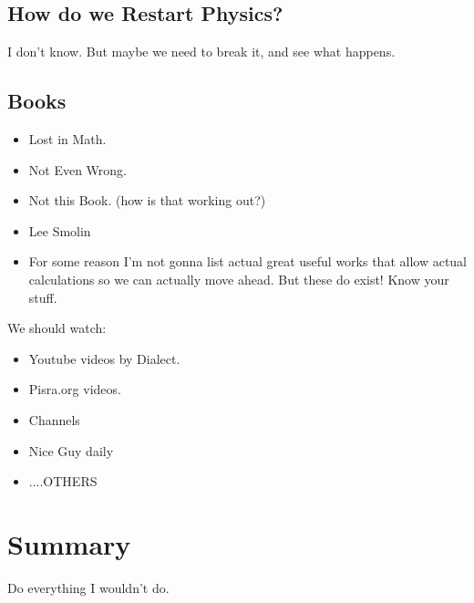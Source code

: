 \documentclass[../rzero]{subfiles}
\begin{document}
\subsection{How do we Restart Physics?}
I don't know. But maybe we need to break it, and see what happens.
\subsection{Books}
\begin{itemize}
  \item Lost in Math.
  \item Not Even Wrong.
  \item Not this Book. (how is that working out?)
  \item Lee Smolin
  \item For some reason I'm not gonna list actual great useful works that allow actual calculations so we can actually move ahead. But these do exist! Know your stuff.
\end{itemize}

We should watch:
\begin{itemize}
  \item Youtube videos by Dialect.
  \item Pisra.org videos.
  \item Channels
  \item Nice Guy daily
  \item ....OTHERS
\end{itemize}

\section{Summary}
Do everything I wouldn't do. 
\end{document}
